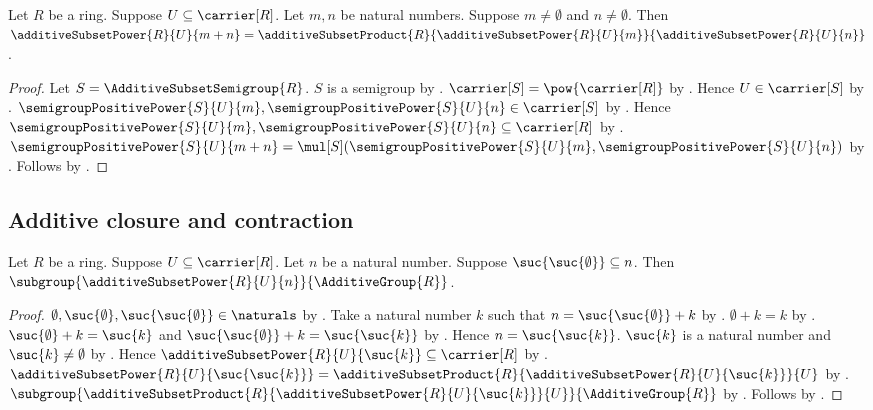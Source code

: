 \begin{theorem}\label{additive_subset_power_addition}
    Let $R$ be a ring.
    Suppose $U\subseteq\carrier[R]$.
    Let $m,n$ be natural numbers.
    Suppose $m\neq\emptyset$ and $n\neq\emptyset$.
    Then $\additiveSubsetPower{R}{U}{m+n}
        =\additiveSubsetProduct{R}{\additiveSubsetPower{R}{U}{m}}
            {\additiveSubsetPower{R}{U}{n}}$.
\end{theorem}
\begin{proof}
    Let $S=\AdditiveSubsetSemigroup{R}$.
    $S$ is a semigroup by .
    $\carrier[S]=\pow{\carrier[R]}$ by
        .
    Hence $U\in\carrier[S]$ by .
    $\semigroupPositivePower{S}{U}{m},
        \semigroupPositivePower{S}{U}{n}\in\carrier[S]$ by
        .
    Hence $\semigroupPositivePower{S}{U}{m},
        \semigroupPositivePower{S}{U}{n}\subseteq\carrier[R]$ by
        .
    $\semigroupPositivePower{S}{U}{m+n}
        =\mul[S](\semigroupPositivePower{S}{U}{m},
            \semigroupPositivePower{S}{U}{n})$ by
        .
    Follows by
        .
\end{proof}

\subsection{Additive closure and contraction}

\begin{theorem}\label{additive_subset_power_is_subgroup}
    Let $R$ be a ring.
    Suppose $U\subseteq\carrier[R]$.
    Let $n$ be a natural number.
    Suppose $\suc{\suc{\emptyset}}\subseteq n$.
    Then
        $\subgroup{\additiveSubsetPower{R}{U}{n}}
            {\AdditiveGroup{R}}$.
\end{theorem}
\begin{proof}
    $\emptyset,\suc{\emptyset},\suc{\suc{\emptyset}}\in\naturals$ by
        .
    Take a natural number $k$ such that
        $n=\suc{\suc{\emptyset}}+k$ by
        .
    $\emptyset+k=k$ by .
    $\suc{\emptyset}+k=\suc{k}$ and
        $\suc{\suc{\emptyset}}+k=\suc{\suc{k}}$ by
        .
    Hence $n=\suc{\suc{k}}$.
    $\suc{k}$ is a natural number and $\suc{k}\neq\emptyset$ by
        .
    Hence $\additiveSubsetPower{R}{U}{\suc{k}}\subseteq\carrier[R]$ by
        .
    $\additiveSubsetPower{R}{U}{\suc{\suc{k}}}
        =\additiveSubsetProduct{R}{
            \additiveSubsetPower{R}{U}{\suc{k}}}{U}$ by
        .
    $\subgroup{
        \additiveSubsetProduct{R}{
            \additiveSubsetPower{R}{U}{\suc{k}}}{U}}
        {\AdditiveGroup{R}}$ by
        .
    Follows by \auto.
\end{proof}

